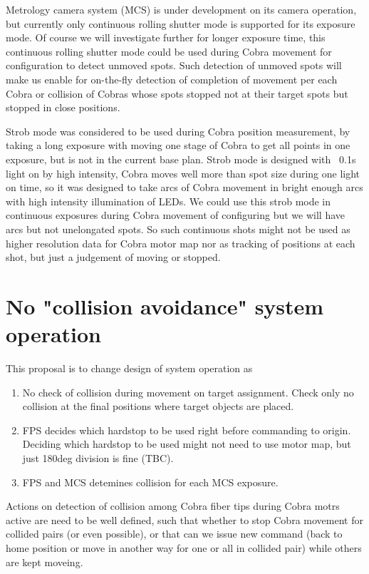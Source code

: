 \documentclass[a4paper,notitlepage]{article}
\begin{document}
Metrology camera system (MCS) is under development on its camera operation, 
but currently only continuous rolling shutter mode is supported for its 
exposure mode. Of course we will investigate further for longer exposure 
time, this continuous rolling shutter mode could be used during Cobra 
movement for configuration to detect unmoved spots. Such detection of 
unmoved spots will make us enable for on-the-fly detection of completion 
of movement per each Cobra or collision of Cobras whose spots stopped not 
at their target spots but stopped in close positions. 

Strob mode was considered to be used during Cobra position measurement, by 
taking a long exposure with moving one stage of Cobra to get all points in 
one exposure, but is not in the current base plan. Strob mode is designed 
with ~0.1s light on by high intensity, Cobra moves well more than spot size 
during one light on time, so it was designed to take arcs of Cobra movement 
in bright enough arcs with high intensity illumination of LEDs. We could use 
this strob mode in continuous exposures during Cobra movement of configuring 
but we will have arcs but not unelongated spots. So such continuous shots 
might not be used as higher resolution data for Cobra motor map nor as 
tracking of positions at each shot, but just a judgement of moving or stopped.


\section{No "collision avoidance" system operation}

This proposal is to change design of system operation as

\begin{enumerate}
  \item No check of collision during movement on target assignment.
    Check only no collision at the final positions where target objects are 
    placed.
  \item FPS decides which hardstop to be used right before commanding to origin.
    Deciding which hardstop to be used might not need to use motor map, but 
    just 180deg division is fine (TBC).
  \item FPS and MCS detemines collision for each MCS exposure.
\end{enumerate}

Actions on detection of collision among Cobra fiber tips during Cobra motrs 
active are need to be well defined, such that whether to stop Cobra movement 
for collided pairs (or even possible), or that can we issue new command (back 
to home position or move in another way for one or all in collided pair) 
while others are kept moveing. 
\end{document}
